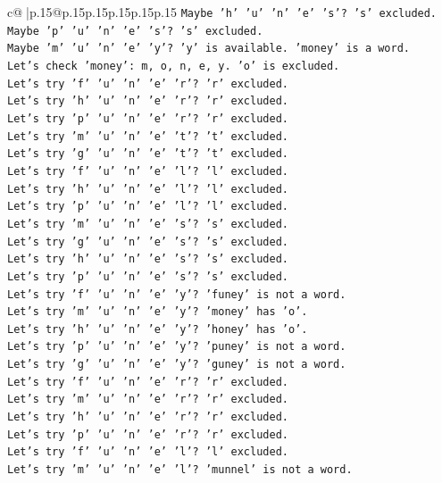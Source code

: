 \documentclass{article}
\begin{document}
{\begin{supertabular}{c@{$\;$}|p{.15\linewidth}@{}p{.15\linewidth}p{.15\linewidth}p{.15\linewidth}p{.15\linewidth}p{.15\linewidth}}
{{{\texttt{Maybe 'h' 'u' 'n' 'e' 's'? 's' excluded.} \\
\texttt{Maybe 'p' 'u' 'n' 'e' 's'? 's' excluded.} \\
\texttt{Maybe 'm' 'u' 'n' 'e' 'y'? 'y' is available. 'money' is a word.} \\
\texttt{Let's check 'money': m, o, n, e, y. 'o' is excluded.} \\
\texttt{Let's try 'f' 'u' 'n' 'e' 'r'? 'r' excluded.} \\
\texttt{Let's try 'h' 'u' 'n' 'e' 'r'? 'r' excluded.} \\
\texttt{Let's try 'p' 'u' 'n' 'e' 'r'? 'r' excluded.} \\
\texttt{Let's try 'm' 'u' 'n' 'e' 't'? 't' excluded.} \\
\texttt{Let's try 'g' 'u' 'n' 'e' 't'? 't' excluded.} \\
\texttt{Let's try 'f' 'u' 'n' 'e' 'l'? 'l' excluded.} \\
\texttt{Let's try 'h' 'u' 'n' 'e' 'l'? 'l' excluded.} \\
\texttt{Let's try 'p' 'u' 'n' 'e' 'l'? 'l' excluded.} \\
\texttt{Let's try 'm' 'u' 'n' 'e' 's'? 's' excluded.} \\
\texttt{Let's try 'g' 'u' 'n' 'e' 's'? 's' excluded.} \\
\texttt{Let's try 'h' 'u' 'n' 'e' 's'? 's' excluded.} \\
\texttt{Let's try 'p' 'u' 'n' 'e' 's'? 's' excluded.} \\
\texttt{Let's try 'f' 'u' 'n' 'e' 'y'? 'funey' is not a word.} \\
\texttt{Let's try 'm' 'u' 'n' 'e' 'y'? 'money' has 'o'.} \\
\texttt{Let's try 'h' 'u' 'n' 'e' 'y'? 'honey' has 'o'.} \\
\texttt{Let's try 'p' 'u' 'n' 'e' 'y'? 'puney' is not a word.} \\
\texttt{Let's try 'g' 'u' 'n' 'e' 'y'? 'guney' is not a word.} \\
\texttt{Let's try 'f' 'u' 'n' 'e' 'r'? 'r' excluded.} \\
\texttt{Let's try 'm' 'u' 'n' 'e' 'r'? 'r' excluded.} \\
\texttt{Let's try 'h' 'u' 'n' 'e' 'r'? 'r' excluded.} \\
\texttt{Let's try 'p' 'u' 'n' 'e' 'r'? 'r' excluded.} \\
\texttt{Let's try 'f' 'u' 'n' 'e' 'l'? 'l' excluded.} \\
\texttt{Let's try 'm' 'u' 'n' 'e' 'l'? 'munnel' is not a word.} \\
}}}
\end{supertabular}}
\end{document}
